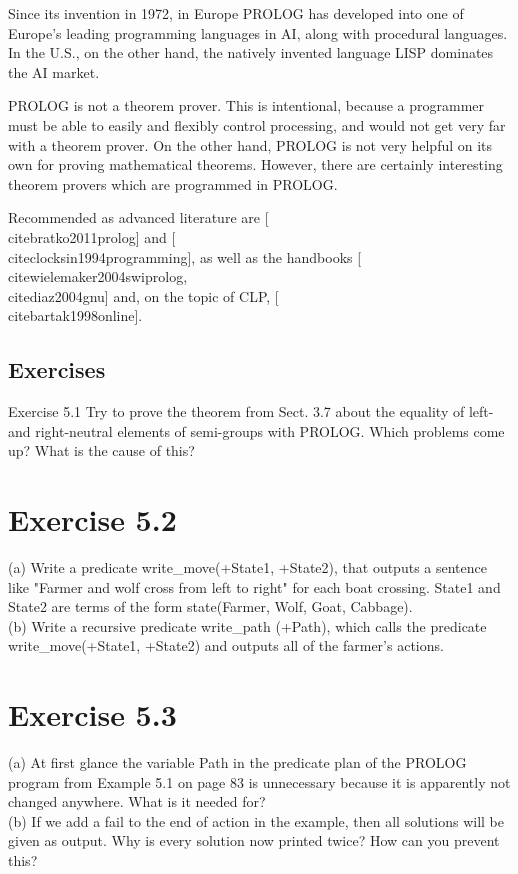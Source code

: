 \documentclass[10pt]{book}
\begin{document}
Since its invention in 1972, in Europe PROLOG has developed into one of Europe's leading programming languages in AI, along with procedural languages. In the U.S., on the other hand, the natively invented language LISP dominates the AI market.

PROLOG is not a theorem prover. This is intentional, because a programmer must be able to easily and flexibly control processing, and would not get very far with a theorem prover. On the other hand, PROLOG is not very helpful on its own for proving mathematical theorems. However, there are certainly interesting theorem provers which are programmed in PROLOG.

Recommended as advanced literature are [\\cite{bratko2011prolog}] and [\\cite{clocksin1994programming}], as well as the handbooks [\\cite{wielemaker2004swiprolog}, \\cite{diaz2004gnu}] and, on the topic of CLP, [\\cite{bartak1998online}].

\subsection*{Exercises}
Exercise 5.1 Try to prove the theorem from Sect. 3.7 about the equality of left- and right-neutral elements of semi-groups with PROLOG. Which problems come up? What is the cause of this?

\section*{Exercise 5.2}
(a) Write a predicate write\_move(+State1, +State2), that outputs a sentence like "Farmer and wolf cross from left to right" for each boat crossing. State1 and State2 are terms of the form state(Farmer, Wolf, Goat, Cabbage).\\
(b) Write a recursive predicate write\_path (+Path), which calls the predicate write\_move(+State1, +State2) and outputs all of the farmer's actions.

\section*{Exercise 5.3}
(a) At first glance the variable Path in the predicate plan of the PROLOG program from Example 5.1 on page 83 is unnecessary because it is apparently not changed anywhere. What is it needed for?\\
(b) If we add a fail to the end of action in the example, then all solutions will be given as output. Why is every solution now printed twice? How can you prevent this?
\end{document}
